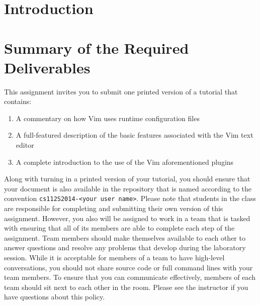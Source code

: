 


\usepackage[compact]{titlesec}



\section*{Introduction}

\section*{Summary of the Required Deliverables}

  This assignment invites you to submit one printed version of a tutorial that contains:

  \begin{enumerate}
    \item A commentary on how Vim uses runtime configuration files
    \item A full-featured description of the basic features associated with the Vim text editor
    \item A complete introduction to the use of the Vim aforementioned plugins 
  \end{enumerate}

  Along with turning in a printed version of your tutorial, you should ensure that your document is also available in the repository
  that is named according to the convention {\tt cs112S2014-<your user name>}. Please note that students in the class are
  responsible for completing and submitting their own version of this assignment.  However, you also will be assigned to work in a
  team that is tasked with ensuring that all of its members are able to complete each step of the assignment.  Team members should
  make themselves available to each other to answer questions and resolve any problems that develop during the laboratory session.
  While it is acceptable for members of a team to have high-level conversations, you should not share source code or full command
  lines with your team members. To ensure that you can communicate effectively, members of each team should sit next to each other
  in the room.  Please see the instructor if you have questions about this policy.

  
